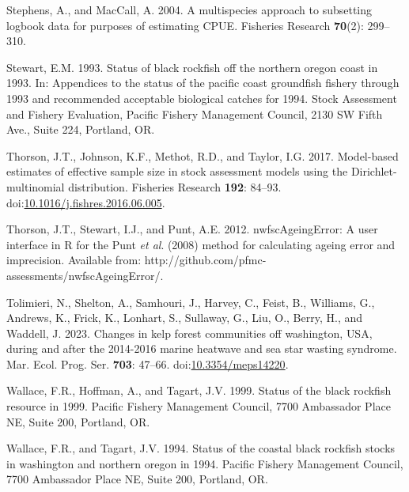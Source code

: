 \documentclass[11pt,
  english,
  letterpaper,
]{article}
\newlength{\cslhangindent}
\newenvironment{CSLReferences}[2] %
 {%
  \setlength{\parindent}{0pt}
  \ifodd #1 \everypar{\setlength{\hangindent}{\cslhangindent}}\ignorespaces\fi
  \ifnum #2 > 0
  \setlength{\parskip}{#2\baselineskip}
  \fi
 }%
 {}
\begin{document}
\begin{CSLReferences}{1}{0}
\leavevmode{}%
Stephens, A., and MacCall, A. 2004. A multispecies approach to subsetting logbook data for purposes of estimating {CPUE}. Fisheries Research \textbf{70}(2): 299--310.

\leavevmode{}%
Stewart, E.M. 1993. Status of black rockfish off the northern oregon coast in 1993. In: Appendices to the status of the pacific coast groundfish fishery through 1993 and recommended acceptable biological catches for 1994. Stock Assessment and Fishery Evaluation, Pacific Fishery Management Council, 2130 SW Fifth Ave., Suite 224, Portland, OR.

\leavevmode{}%
Thorson, J.T., Johnson, K.F., Methot, R.D., and Taylor, I.G. 2017. Model-based estimates of effective sample size in stock assessment models using the {Dirichlet}-multinomial distribution. Fisheries Research \textbf{192}: 84--93. doi:\href{https://doi.org/10.1016/j.fishres.2016.06.005}{10.1016/j.fishres.2016.06.005}.

\leavevmode{}%
Thorson, J.T., Stewart, I.J., and Punt, A.E. 2012. {nwfscAgeingError}: A user interface in {R} for the {P}unt \emph{et al}. (2008) method for calculating ageing error and imprecision. Available from: http://github.com/pfmc-assessments/nwfscAgeingError/.

\leavevmode{}%
Tolimieri, N., Shelton, A., Samhouri, J., Harvey, C., Feist, B., Williams, G., Andrews, K., Frick, K., Lonhart, S., Sullaway, G., Liu, O., Berry, H., and Waddell, J. 2023. Changes in kelp forest communities off washington, {USA}, during and after the 2014-2016 marine heatwave and sea star wasting syndrome. Mar. Ecol. Prog. Ser. \textbf{703}: 47--66. doi:\href{https://doi.org/10.3354/meps14220}{10.3354/meps14220}.

\leavevmode{}%
Wallace, F.R., Hoffman, A., and Tagart, J.V. 1999. Status of the black rockfish resource in 1999. Pacific Fishery Management Council, 7700 Ambassador Place NE, Suite 200, Portland, OR.

\leavevmode{}%
Wallace, F.R., and Tagart, J.V. 1994. Status of the coastal black rockfish stocks in washington and northern oregon in 1994. Pacific Fishery Management Council, 7700 Ambassador Place NE, Suite 200, Portland, OR.


\end{CSLReferences}
\end{document}
